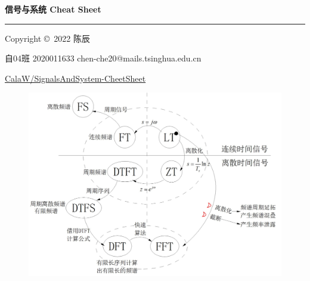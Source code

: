 \documentclass[10pt,landscape,a4paper]{ctexart}
\begin{document}
\raggedright
\footnotesize
\begin{multicols*}{5}


\setlength{\premulticols}{1pt}
\setlength{\postmulticols}{1pt}
\setlength{\multicolsep}{1pt}
\setlength{\columnsep}{2pt}

\begin{center}
     \large{\textbf{信号与系统 Cheat Sheet}} \\
\end{center}

\scriptsize









\rule{0.3\linewidth}{0.25pt}
\scriptsize

Copyright \copyright\ 2022 陈辰

自04班 2020011633 chen-che20@mails.tsinghua.edu.cn

\tiny\url{CalaW/SignalsAndSystem-CheetSheet}


\vspace{-10pt}
\begin{figure}[H]
    \centering
    \includegraphics[width=2\linewidth]{figure/sum.png}
\end{figure}
\end{multicols*}
\end{document}
